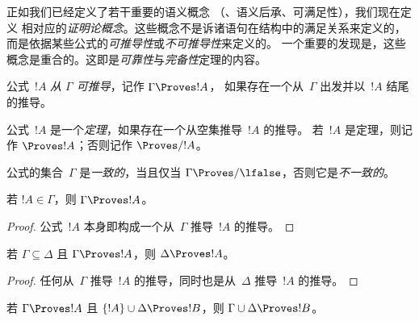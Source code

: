 \documentclass[../../../include/open-logic-section]{subfiles}
\begin{document}
      {}
      {}


\begin{explain}
正如我们已经定义了若干重要的语义概念
（、语义后承、可满足性），我们现在定义
相对应的\emph{证明论概念}。这些概念不是诉诸语句在结构中的满足关系来定义的，
而是依据某些公式的\emph{可推导性}或\emph{不可推导性}来定义的。
一个重要的发现是，这些概念是重合的。这即是\emph{可靠性}与\emph{完备性}定理的内容。
\end{explain}

\begin{defn}[可推导性]
公式~$!A$ \emph{从 $\Gamma$ 可推导}，记作 $\Gamma \Proves !A$，
如果存在一个从~$\Gamma$ 出发并以~$!A$ 结尾的推导。
\end{defn}

\begin{defn}[定理]
公式~$!A$ 是一个\emph{定理}，如果存在一个从空集推导~$!A$ 的推导。
若~$!A$ 是定理，则记作 $\Proves !A$；否则记作 $\Proves/ !A$。
\end{defn}

\begin{defn}[一致性]
公式的集合~$\Gamma$ 是\emph{一致的}，当且仅当 $\Gamma\Proves/ \lfalse$，否则它是\emph{不一致的}。
\end{defn}

\begin{prop}[自反性]
若 $!A \in \Gamma$，则 $\Gamma \Proves !A$。
\end{prop}

\begin{proof}
  公式~$!A$ 本身即构成一个从~$\Gamma$ 推导~$!A$ 的推导。
\end{proof}

\begin{prop}[单调性]
若 $\Gamma \subseteq \Delta$ 且 $\Gamma \Proves !A$，则 $\Delta \Proves !A$。
\end{prop}

\begin{proof}
  任何从~$\Gamma$ 推导~$!A$ 的推导，同时也是从~$\Delta$ 推导~$!A$ 的推导。
\end{proof}

\begin{prop}[传递性]
若 $\Gamma \Proves !A$ 且 $\{!A\} \cup \Delta \Proves
!B$，则 $\Gamma \cup \Delta \Proves !B$。
\end{prop}
\end{document}
